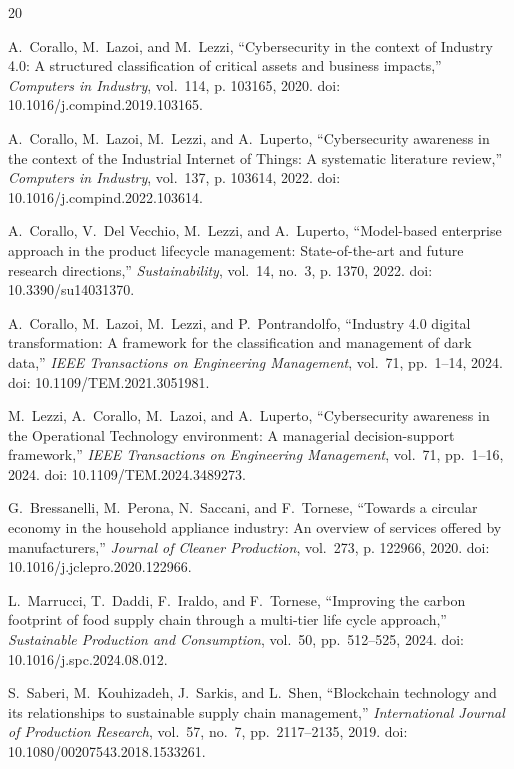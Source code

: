 \documentclass[journal]{IEEEtran}
\begin{document}
\begin{thebibliography}{20}

A.~Corallo, M.~Lazoi, and M.~Lezzi, ``Cybersecurity in the context of Industry 4.0: A structured classification of critical assets and business impacts,'' \emph{Computers in Industry}, vol.~114, p. 103165, 2020. doi: 10.1016/j.compind.2019.103165.

A.~Corallo, M.~Lazoi, M.~Lezzi, and A.~Luperto, ``Cybersecurity awareness in the context of the Industrial Internet of Things: A systematic literature review,'' \emph{Computers in Industry}, vol.~137, p. 103614, 2022. doi: 10.1016/j.compind.2022.103614.

A.~Corallo, V.~Del Vecchio, M.~Lezzi, and A.~Luperto, ``Model-based enterprise approach in the product lifecycle management: State-of-the-art and future research directions,'' \emph{Sustainability}, vol.~14, no.~3, p. 1370, 2022. doi: 10.3390/su14031370.

A.~Corallo, M.~Lazoi, M.~Lezzi, and P.~Pontrandolfo, ``Industry 4.0 digital transformation: A framework for the classification and management of dark data,'' \emph{IEEE Transactions on Engineering Management}, vol.~71, pp.~1--14, 2024. doi: 10.1109/TEM.2021.3051981.

M.~Lezzi, A.~Corallo, M.~Lazoi, and A.~Luperto, ``Cybersecurity awareness in the Operational Technology environment: A managerial decision-support framework,'' \emph{IEEE Transactions on Engineering Management}, vol.~71, pp.~1--16, 2024. doi: 10.1109/TEM.2024.3489273.

G.~Bressanelli, M.~Perona, N.~Saccani, and F.~Tornese, ``Towards a circular economy in the household appliance industry: An overview of services offered by manufacturers,'' \emph{Journal of Cleaner Production}, vol.~273, p. 122966, 2020. doi: 10.1016/j.jclepro.2020.122966.

L.~Marrucci, T.~Daddi, F.~Iraldo, and F.~Tornese, ``Improving the carbon footprint of food supply chain through a multi-tier life cycle approach,'' \emph{Sustainable Production and Consumption}, vol.~50, pp.~512--525, 2024. doi: 10.1016/j.spc.2024.08.012.

S.~Saberi, M.~Kouhizadeh, J.~Sarkis, and L.~Shen, ``Blockchain technology and its relationships to sustainable supply chain management,'' \emph{International Journal of Production Research}, vol.~57, no.~7, pp.~2117--2135, 2019. doi: 10.1080/00207543.2018.1533261.


\end{thebibliography}
\end{document}
